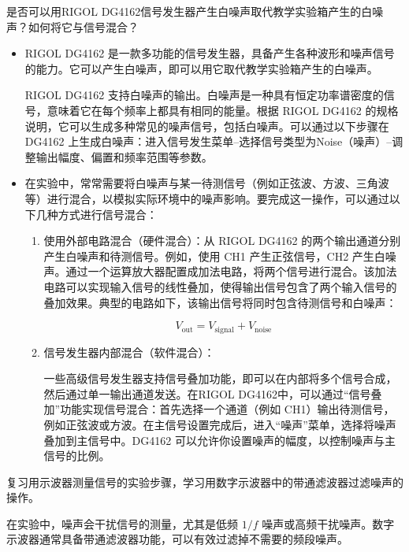\begin{question}
	是否可以用RIGOL DG4162信号发生器产生白噪声取代教学实验箱产生的白噪声？如何将它与信号混合？
\end{question}
\begin{itemize}
	\item RIGOL DG4162 是一款多功能的信号发生器，具备产生各种波形和噪声信号的能力。它可以产生白噪声，即可以用它取代教学实验箱产生的白噪声。
	
	RIGOL DG4162 支持白噪声的输出。白噪声是一种具有恒定功率谱密度的信号，意味着它在每个频率上都具有相同的能量。根据 RIGOL DG4162 的规格说明，它可以生成多种常见的噪声信号，包括白噪声。可以通过以下步骤在 DG4162 上生成白噪声：进入信号发生菜单--选择信号类型为Noise（噪声）--调整输出幅度、偏置和频率范围等参数。
	
	\item 在实验中，常常需要将白噪声与某一待测信号（例如正弦波、方波、三角波等）进行混合，以模拟实际环境中的噪声影响。要完成这一操作，可以通过以下几种方式进行信号混合：
	\begin{enumerate}
		\item 使用外部电路混合（硬件混合）：从 RIGOL DG4162 的两个输出通道分别产生白噪声和待测信号。例如，使用 CH1 产生正弦信号，CH2 产生白噪声。通过一个运算放大器配置成加法电路，将两个信号进行混合。该加法电路可以实现输入信号的线性叠加，使得输出信号包含了两个输入信号的叠加效果。典型的电路如下，该输出信号将同时包含待测信号和白噪声：
		 
		\[
		V_{\text{out}} = V_{\text{signal}} + V_{\text{noise}}
		\]
		
		\item  信号发生器内部混合（软件混合）：
		
		一些高级信号发生器支持信号叠加功能，即可以在内部将多个信号合成，然后通过单一输出通道发送。在RIGOL DG4162中，可以通过“信号叠加”功能实现信号混合：首先选择一个通道（例如 CH1）输出待测信号，例如正弦波或方波。在主信号设置完成后，进入“噪声”菜单，选择将噪声叠加到主信号中。DG4162 可以允许你设置噪声的幅度，以控制噪声与主信号的比例。
	\end{enumerate}
\end{itemize}

\begin{question}
	复习用示波器测量信号的实验步骤，学习用数字示波器中的带通滤波器过滤噪声的操作。
\end{question}
在实验中，噪声会干扰信号的测量，尤其是低频 $1/f$ 噪声或高频干扰噪声。数字示波器通常具备带通滤波器功能，可以有效过滤掉不需要的频段噪声。

